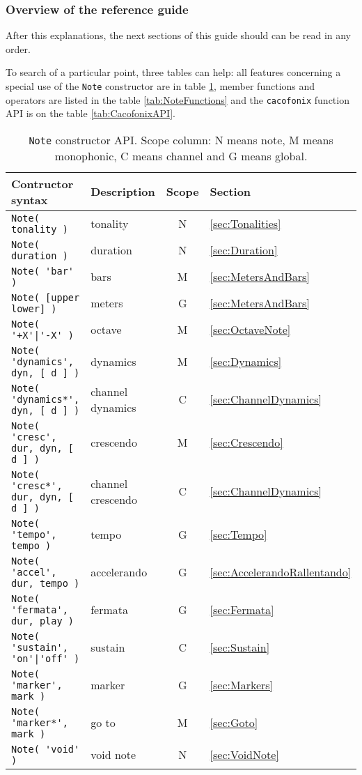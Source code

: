 \documentclass{article}
\begin{document}
\subsubsection{Overview of the reference guide}

After this explanations, the next sections of this guide should can be read in any order. 

To search of a particular point, three tables can help: all features concerning a special use of the \lstinline!Note! constructor are in table \ref{tab:NoteAPI}, member functions and operators are listed in the table \ref{tab:NoteFunctions} and the \lstinline!cacofonix! function API is on the table \ref{tab:CacofonixAPI}.

\begin{table}[p]
	\centering
	\begin{tabular}{llcl}
		Contructor syntax & Description & Scope & Section \\
		\hline
		\lstinline!Note( tonality )! & tonality & N & \ref{sec:Tonalities} \\
		\lstinline!Note( duration )! & duration & N & \ref{sec:Duration} \\
		\lstinline!Note( 'bar' )! & bars & M & \ref{sec:MetersAndBars} \\
		\lstinline!Note( [upper lower] )! & meters & G & \ref{sec:MetersAndBars} \\
		\lstinline!Note( '+X'|'-X' )! & octave & M & \ref{sec:OctaveNote} \\
		\lstinline!Note( 'dynamics', dyn, [ d ] )! & dynamics & M & \ref{sec:Dynamics} \\
		\lstinline!Note( 'dynamics*', dyn, [ d ] )! & channel dynamics & C & \ref{sec:ChannelDynamics} \\
		\lstinline!Note( 'cresc', dur, dyn, [ d ] )! & crescendo & M & \ref{sec:Crescendo} \\
		\lstinline!Note( 'cresc*', dur, dyn, [ d ] )! & channel crescendo & C & \ref{sec:ChannelDynamics} \\
		\lstinline!Note( 'tempo', tempo )! & tempo & G & \ref{sec:Tempo} \\
		\lstinline!Note( 'accel', dur, tempo )! & accelerando & G & \ref{sec:AccelerandoRallentando} \\
		\lstinline!Note( 'fermata', dur, play )! & fermata & G & \ref{sec:Fermata} \\
		\lstinline!Note( 'sustain', 'on'|'off' )! & sustain & C & \ref{sec:Sustain} \\
		\lstinline!Note( 'marker', mark )! & marker & G & \ref{sec:Markers} \\
		\lstinline!Note( 'marker*', mark )! & go to & M & \ref{sec:Goto} \\
		\lstinline!Note( 'void' )! & void note & N & \ref{sec:VoidNote} \\
	\end{tabular}
	\caption[\lstinline!Note! constructor API]{\lstinline!Note! constructor API. Scope column: N means note, M means monophonic, C means channel and G means global.}
	\label{tab:NoteAPI}
\end{table}
\end{document}
